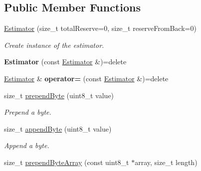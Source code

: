 \subsection*{Public Member Functions}
\begin{DoxyCompactItemize}
\item 
\hyperlink{classndn_1_1encoding_1_1Estimator_a1fd365e6cda48ffd0492a7a352706668}{Estimator} (size\+\_\+t total\+Reserve=0, size\+\_\+t reserve\+From\+Back=0)
\begin{DoxyCompactList}\small\item\em Create instance of the estimator. \end{DoxyCompactList}\item 
{\bfseries Estimator} (const \hyperlink{classndn_1_1encoding_1_1Estimator}{Estimator} \&)=delete\hypertarget{classndn_1_1encoding_1_1Estimator_aab3e79b18f73f13589baf13c3c02ec64}{}\label{classndn_1_1encoding_1_1Estimator_aab3e79b18f73f13589baf13c3c02ec64}

\item 
\hyperlink{classndn_1_1encoding_1_1Estimator}{Estimator} \& {\bfseries operator=} (const \hyperlink{classndn_1_1encoding_1_1Estimator}{Estimator} \&)=delete\hypertarget{classndn_1_1encoding_1_1Estimator_ab849b89cb4b81f55ab4565dc8a42a151}{}\label{classndn_1_1encoding_1_1Estimator_ab849b89cb4b81f55ab4565dc8a42a151}

\item 
size\+\_\+t \hyperlink{classndn_1_1encoding_1_1Estimator_a39cf79cd67fc918ef727db358ee3e8ee}{prepend\+Byte} (uint8\+\_\+t value)\hypertarget{classndn_1_1encoding_1_1Estimator_a39cf79cd67fc918ef727db358ee3e8ee}{}\label{classndn_1_1encoding_1_1Estimator_a39cf79cd67fc918ef727db358ee3e8ee}

\begin{DoxyCompactList}\small\item\em Prepend a byte. \end{DoxyCompactList}\item 
size\+\_\+t \hyperlink{classndn_1_1encoding_1_1Estimator_a24f80ee4ba79600b9db1803df986cc10}{append\+Byte} (uint8\+\_\+t value)\hypertarget{classndn_1_1encoding_1_1Estimator_a24f80ee4ba79600b9db1803df986cc10}{}\label{classndn_1_1encoding_1_1Estimator_a24f80ee4ba79600b9db1803df986cc10}

\begin{DoxyCompactList}\small\item\em Append a byte. \end{DoxyCompactList}\item 
size\+\_\+t \hyperlink{classndn_1_1encoding_1_1Estimator_a5263f790932d92faaa8ac688ad30a521}{prepend\+Byte\+Array} (const uint8\+\_\+t $\ast$array, size\+\_\+t length)\hypertarget{classndn_1_1encoding_1_1Estimator_a5263f790932d92faaa8ac688ad30a521}{}\label{classndn_1_1encoding_1_1Estimator_a5263f790932d92faaa8ac688ad30a521}


\end{DoxyCompactItemize}
